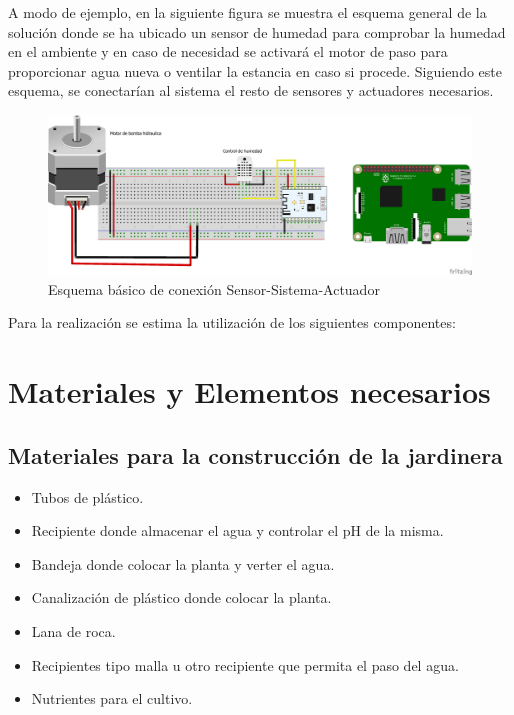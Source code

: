 \documentclass[12pt,a4paper,titlepage,oneside]{report}
\begin{document}
	A modo de ejemplo, en la siguiente figura se muestra el esquema general de la solución donde se ha ubicado un sensor de humedad para comprobar la humedad en el ambiente y en caso de necesidad se activará el motor de paso para proporcionar agua nueva o ventilar la estancia en caso si procede. Siguiendo este esquema, se conectarían al sistema el resto de sensores y actuadores necesarios.
	
	\begin{figure}
		\center
		\includegraphics[scale=0.5]{./images/Conexion.png}
		\caption{Esquema básico de conexión Sensor-Sistema-Actuador}
		\label{Esquema_basico}
	\end{figure}		
	
	Para la realización se estima la utilización de los siguientes componentes:	
	
	\section{Materiales y Elementos necesarios\cite{2014}}
	\subsection*{Materiales para la construcción de la jardinera}

		\begin{itemize}
			\item Tubos de plástico.
			\item Recipiente donde almacenar el agua y controlar el pH de la misma.
			\item Bandeja donde colocar la planta y verter el agua.
			\item Canalización de plástico donde colocar la planta.
			\item Lana de roca.
			\item Recipientes tipo malla u otro recipiente que permita el paso del agua.
			\item Nutrientes para el cultivo.
		\end{itemize}			
	
\end{document}
